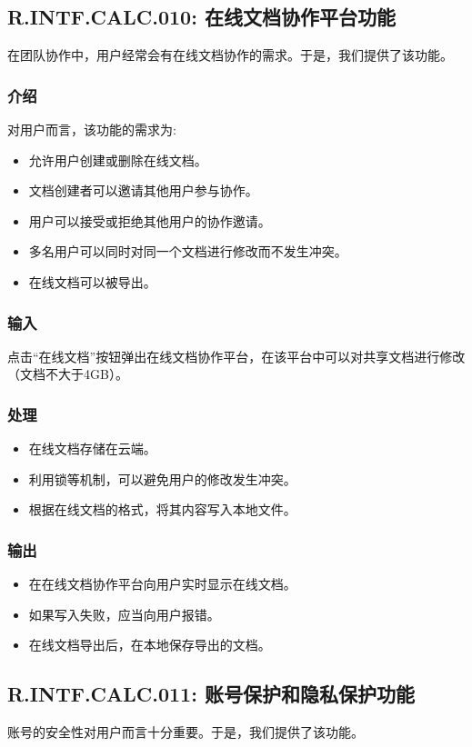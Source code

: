 \subsection{R.INTF.CALC.010: 在线文档协作平台功能}
在团队协作中，用户经常会有在线文档协作的需求。于是，我们提供了该功能。
\subsubsection{介绍}
对用户而言，该功能的需求为:
\begin{itemize}
  \item 允许用户创建或删除在线文档。
  \item 文档创建者可以邀请其他用户参与协作。
  \item 用户可以接受或拒绝其他用户的协作邀请。
  \item 多名用户可以同时对同一个文档进行修改而不发生冲突。
  \item 在线文档可以被导出。
\end{itemize}
\subsubsection{输入}
点击“在线文档”按钮弹出在线文档协作平台，在该平台中可以对共享文档进行修改（文档不大于4GB）。
\subsubsection{处理}
\begin{itemize}
  \item 在线文档存储在云端。
  \item 利用锁等机制，可以避免用户的修改发生冲突。
  \item 根据在线文档的格式，将其内容写入本地文件。
\end{itemize}
\subsubsection{输出}
\begin{itemize}
  \item 在在线文档协作平台向用户实时显示在线文档。
  \item 如果写入失败，应当向用户报错。
  \item 在线文档导出后，在本地保存导出的文档。
\end{itemize}

\subsection{R.INTF.CALC.011: 账号保护和隐私保护功能}
账号的安全性对用户而言十分重要。于是，我们提供了该功能。
